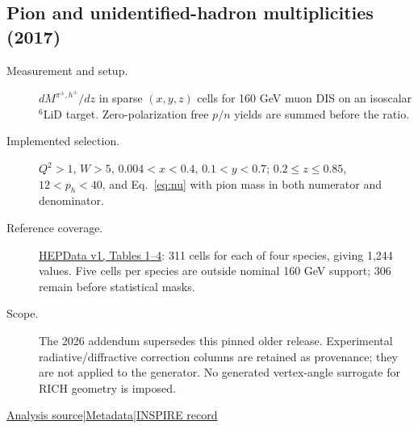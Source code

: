 \documentclass[11pt,a4paper]{article}
\newcommand{\id}[1]{{\small\texttt{\detokenize{#1}}}}
\begin{document}
\subsection{\texorpdfstring{Pion and unidentified-hadron multiplicities (2017)}{Pion and unidentified-hadron multiplicities (2017)}}
\id{COMPASS_2017_I1444985}\quad\cite{r1444985}
\begin{description}
\item[Measurement and setup.] $dM^{\pi^\pm,h^\pm}/dz$ in sparse $(x,y,z)$ cells for 160 GeV muon DIS on an isoscalar $^6$LiD target. Zero-polarization free $p/n$ yields are summed before the ratio.
\item[Implemented selection.] $Q^2>1$, $W>5$, $0.004<x<0.4$, $0.1<y<0.7$; $0.2\le z\le0.85$, $12<p_h<40$, and Eq.~\eqref{eq:nu} with pion mass in both numerator and denominator.
\item[Reference coverage.] \href{https://www.hepdata.net/record/ins1444985?version=1}{HEPData v1, Tables 1--4}: 311 cells for each of four species, giving 1,244 values. Five cells per species are outside nominal 160 GeV support; 306 remain before statistical masks.
\item[Scope.] The 2026 addendum supersedes this pinned older release. Experimental radiative/diffractive correction columns are retained as provenance; they are not applied to the generator. No generated vertex-angle surrogate for RICH geometry is imposed.
\end{description}
{\small\href{https://github.com/apapaefs/HerwigPolarizedPheno/blob/105045bd757aaa6b217e87811dc5f9a22a8d1cef/analyses/rivet/dis/COMPASS_2017_I1444985.cc}{Analysis source}\quad|\quad\href{https://github.com/apapaefs/HerwigPolarizedPheno/blob/105045bd757aaa6b217e87811dc5f9a22a8d1cef/analyses/rivet/dis/COMPASS_2017_I1444985.info}{Metadata}\quad|\quad\href{https://inspirehep.net/literature/1444985}{INSPIRE record}}
\end{document}
